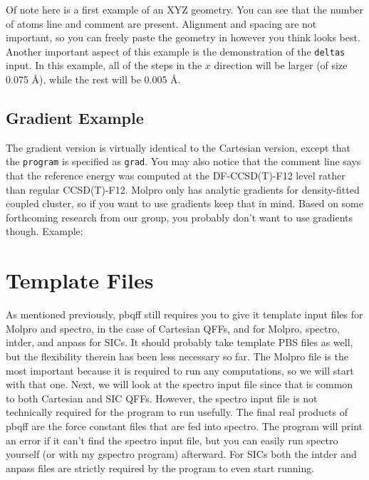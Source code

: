 \documentclass{article}
\begin{document}


Of note here is a first example of an XYZ geometry. You can see that
the number of atoms line and comment are present. Alignment and
spacing are not important, so you can freely paste the geometry in
however you think looks best. Another important aspect of this example
is the demonstration of the \verb|deltas| input. In this example, all
of the steps in the $x$ direction will be larger (of size 0.075
\AA{}), while the rest will be 0.005 \AA{}.

\subsection{Gradient Example}

The gradient version is virtually identical to the Cartesian version,
except that the \verb|program| is specified as \verb|grad|. You may
also notice that the comment line says that the reference energy was
computed at the DF-CCSD(T)-F12 level rather than regular
CCSD(T)-F12. Molpro only has analytic gradients for density-fitted
coupled cluster, so if you want to use gradients keep that in
mind. Based on some forthcoming research from our group, you probably
don't want to use gradients though. Example:



\section{Template Files}

As mentioned previously, pbqff still requires you to give it template
input files for Molpro and spectro, in the case of Cartesian QFFs, and
for Molpro, spectro, intder, and anpass for SICs. It should probably
take template PBS files as well, but the flexibility therein has been
less necessary so far. The Molpro file is the most important because
it is required to run any computations, so we will start with that
one. Next, we will look at the spectro input file since that is common
to both Cartesian and SIC QFFs. However, the spectro input file is not
technically required for the program to run usefully. The final real
products of pbqff are the force constant files that are fed into
spectro. The program will print an error if it can't find the spectro
input file, but you can easily run spectro yourself (or with my
gspectro program) afterward. For SICs both the intder and anpass files
are strictly required by the program to even start running.
\end{document}
